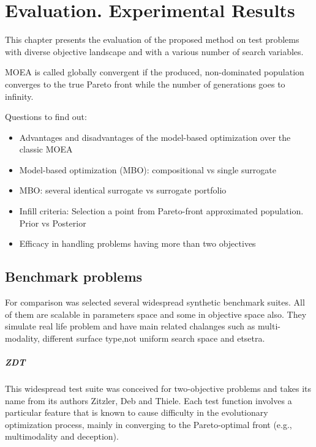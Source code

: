 \chapter{Evaluation. Experimental Results} 

This chapter presents the evaluation of the proposed method on test problems with diverse objective landscape and with a various number of search variables.

MOEA is called globally convergent if the produced, non-dominated population converges to the true Pareto front while the number of generations goes to infinity.

Questions to find out:
\begin{itemize}
    \item Advantages and disadvantages of the model-based optimization over the classic MOEA
    \item Model-based optimization (MBO): compositional vs single surrogate 
    \item MBO: several identical surrogate vs surrogate portfolio
    \item Infill criteria: Selection a point from Pareto-front approximated population. Prior vs Posterior
    \item Efficacy in handling problems having more than two objectives
\end{itemize}

\cite{kouwe2018benchmarking}

\section{Benchmark problems}
For comparison was selected several widespread synthetic benchmark suites. All of them are scalable in parameters space and some in objective space also. They simulate real life problem and have main related chalanges such as multi-modality, different surface type,not uniform search space and etsetra.

    \paragraph{ZDT}
    This widespread test suite\cite{ZitzlerDT00} was conceived for two-objective problems and takes its name from its authors Zitzler, Deb and Thiele. Each test function involves a particular feature that is known to cause difficulty in the evolutionary optimization process, mainly in converging to the Pareto-optimal front (e.g., multimodality and deception).

